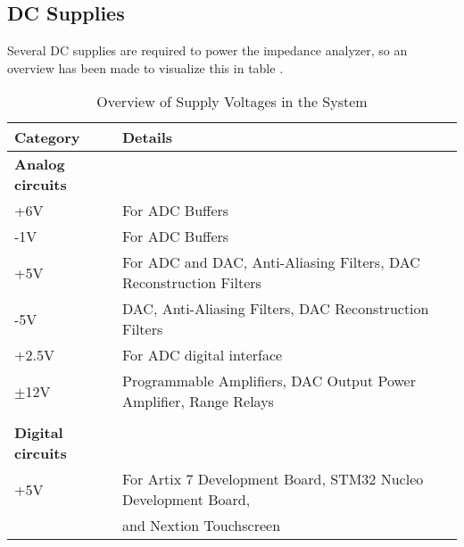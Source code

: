 \subsection{DC Supplies} \label{subsec:DCSupples}

Several DC supplies are required to power the impedance analyzer, so an overview has been made to visualize this in table .
\begin{table}[ht]
\centering
\begin{tabular}{@{}ll@{}}
\toprule
\textbf{Category}       & \textbf{Details}                                                                                 \\ \midrule
\textbf{Analog circuits} &                                                                                                 \\
\quad +6V                & For ADC Buffers                                                                                \\
\quad -1V                & For ADC Buffers                                                                                \\
\quad +5V                & For ADC and DAC, Anti-Aliasing Filters, DAC Reconstruction Filters                                                                                  \\
\quad -5V                & DAC, Anti-Aliasing Filters, DAC Reconstruction Filters  \\
\quad +2.5V              & For ADC digital interface                                                                      \\
\quad $\pm$12V           & Programmable Amplifiers, DAC Output Power Amplifier, Range Relays               \\
                         &                                                        \\ \midrule
\textbf{Digital circuits} &                                                                                                 \\
\quad +5V                & For Artix 7 Development Board, STM32 Nucleo Development Board,                                 \\
                         & and Nextion Touchscreen                                                                        \\ \bottomrule
\end{tabular}
\caption{Overview of Supply Voltages in the System}
\label{tab:7_1_6_Supply_Voltages}
\end{table}

